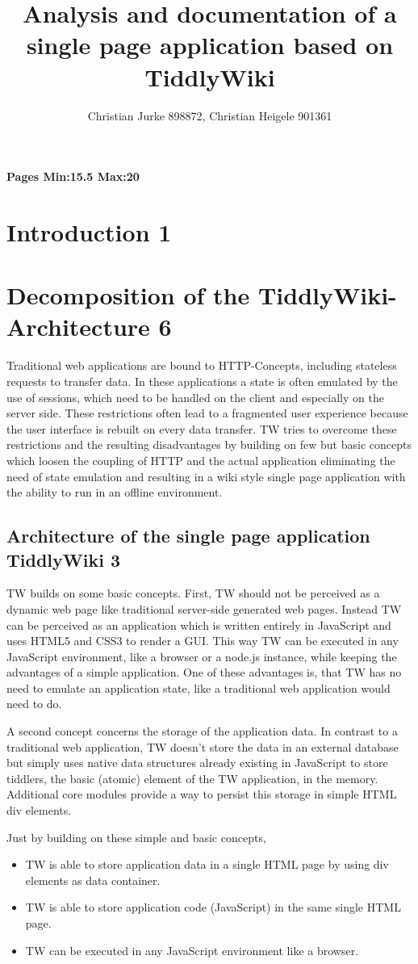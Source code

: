 \documentclass[12pt,a4paper]{article}
\title{Analysis and documentation of a single page application based on TiddlyWiki}
\author{Christian Jurke 898872, Christian Heigele 901361}
\begin{document}
\maketitle
\tableofcontents
\textbf{Pages Min:15.5 Max:20 }
\section{Introduction 1}
\section{Decomposition of the TiddlyWiki-Architecture 6}
Traditional web applications are bound to HTTP-Concepts, including stateless requests to transfer data. In these applications a state is often emulated by the use of sessions, which need to be handled on the client and especially on the server side.
These restrictions often lead to a fragmented user experience because the user interface is rebuilt on every data transfer.
TW tries to overcome these restrictions and the resulting disadvantages by building on few but basic concepts which loosen the coupling of HTTP and the actual application eliminating the need of state emulation and resulting in a wiki style single page application with the ability to run in an offline environment.
\subsection{Architecture of the single page application TiddlyWiki 3}
TW builds on some basic concepts. First, TW should not be perceived as a dynamic web page like traditional server-side generated web pages. Instead TW can be perceived as an application which is written entirely in JavaScript and uses HTML5 and CSS3 to render a GUI. This way TW can be executed in any JavaScript environment, like a browser or a node.js instance, while keeping the advantages of a simple application.
One of these advantages is, that TW has no need to emulate an application state, like a traditional web application would need to do.

A second concept concerns the storage of the application data. In contrast to a traditional web application, TW doesn't store the data in an external database but simply uses native data structures already existing in JavaScript to store tiddlers, the basic (atomic) element of the TW application, in the memory. Additional core modules provide a way to persist this storage in simple HTML div elements.

Just by building on these simple and basic concepts,
\begin{itemize}
\item TW is able to store application data in a single HTML page by using div elements as data container.
\item TW is able to store application code (JavaScript) in the same single HTML page.
\item TW can be executed in any JavaScript environment like a browser.
\end{itemize}
\end{document}
